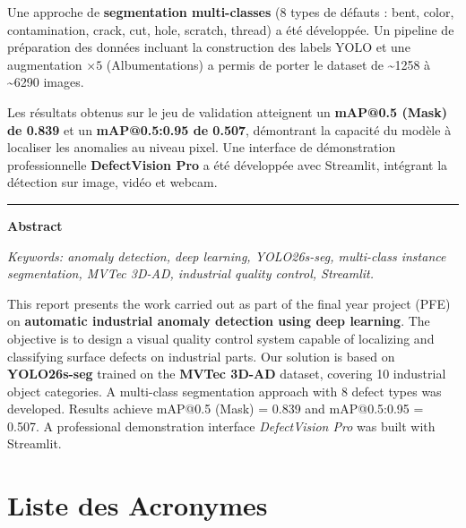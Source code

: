 \documentclass[12pt, a4paper]{report}
\begin{document}
Une approche de \textbf{segmentation multi-classes} (8 types de défauts : bent, color, contamination, crack, cut, hole, scratch, thread) a été développée. Un pipeline de préparation des données incluant la construction des labels YOLO et une augmentation $\times 5$ (Albumentations) a permis de porter le dataset de \textasciitilde1258 à \textasciitilde6290 images.

Les résultats obtenus sur le jeu de validation atteignent un \textbf{mAP@0.5 (Mask) de 0.839} et un \textbf{mAP@0.5:0.95 de 0.507}, démontrant la capacité du modèle à localiser les anomalies au niveau pixel. Une interface de démonstration professionnelle \textbf{DefectVision Pro} a été développée avec Streamlit, intégrant la détection sur image, vidéo et webcam.

\vspace{0.5cm}
\noindent\rule{\textwidth}{0.4pt}

\noindent\textbf{Abstract}

\vspace{0.3cm}
\noindent\textit{Keywords: anomaly detection, deep learning, YOLO26s-seg, multi-class instance segmentation, MVTec 3D-AD, industrial quality control, Streamlit.}

\vspace{0.3cm}

This report presents the work carried out as part of the final year project (PFE) on \textbf{automatic industrial anomaly detection using deep learning}. The objective is to design a visual quality control system capable of localizing and classifying surface defects on industrial parts. Our solution is based on \textbf{YOLO26s-seg} trained on the \textbf{MVTec 3D-AD} dataset, covering 10 industrial object categories. A multi-class segmentation approach with 8 defect types was developed. Results achieve mAP@0.5 (Mask) = 0.839 and mAP@0.5:0.95 = 0.507. A professional demonstration interface \textit{DefectVision Pro} was built with Streamlit.

\newpage

\chapter*{Liste des Acronymes}

\begin{acronym}[YOLO26s]
\end{acronym}
\end{document}
